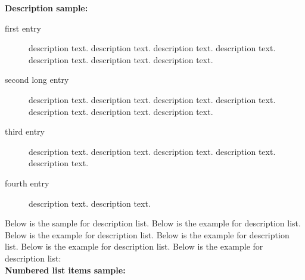 \documentclass[proof]{WileyASNA-v1}
\begin{document}
\noindent\textbf{Description sample:}

\begin{description}
\item[first entry] description text. description text. description text. description text. description text. description text. description text. 
\item[second long entry] description text. description text. description text. description text. description text. description text. description text. 
\item[third entry] description text. description text. description text. description text. description text. 
\item[fourth entry] description text. description text. 
\end{description}

Below is the sample for description list. Below is the example for description list. Below is the example for description list. Below is the example for description list. Below is the example for description list. Below is the example for description list:\\[12pt]

\noindent\textbf{Numbered list items sample:}
\end{document}
